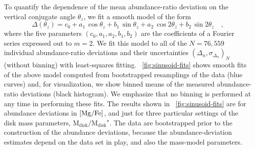 \documentclass[modern]{aastex63}
\newcommand{\mdisk}{\ensuremath{\mathrm{M}_\mathrm{disk}}}
\newcommand{\mratio}{\ensuremath{\mdisk / \mdisk^\star}}
\begin{document}
To quantify the dependence of the mean abundance-ratio deviation on the vertical
conjugate angle $\theta_z$, we fit a smooth model of the form
\begin{equation}
  \Delta(\theta_z) = c_0 + a_1\,\cos  \theta_z + b_1\,\sin    \theta_z
                         + a_2\,\cos 2\theta_z + b_2\,\sin 2\theta_z \quad,
                         \label{eq:fouriermodel}
\end{equation}
where the five parameters $(c_0, a_1, a_2, b_1, b_2)$ are the coefficients of a
Fourier series expressed out to $m=2$.
We fit this model to all of the $N=76,559$ individual abundance-ratio deviations
and their uncertainties $(\Delta_n, \sigma_{\Delta_n})_N$ (without binning) with
least-squares fitting.
\figurename~\ref{fig:sinusoid-fits} shows smooth fits of the above model
computed from bootstrapped resamplings of the data (blue curves) and, for
visualization, we show binned means of the measured abundance-ratio deviations
(black histogram).
We emphasize that no binning is performed at any time in performing these fits.
The results shown in \figurename~\ref{fig:sinusoid-fits} are for abundance
deviations in ${[\mathrm{Mg}/\mathrm{Fe}]}$, and just for three particular settings of the disk mass
parameters, \mratio.
The data are bootstrapped prior to the construction of the abundance deviations,
because the abundance-deviation estimates depend on the data set in play, and
also the mass-model parameters.
\end{document}
